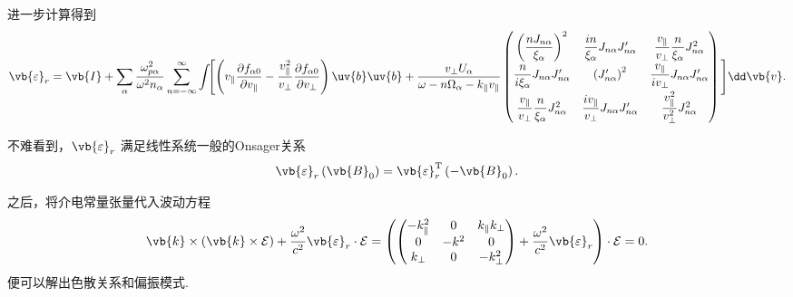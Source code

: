 进一步计算得到
\begin{align*}
	\vb{\varepsilon}_r = \vb{I} + \sum_\alpha \frac{\omega_{p\alpha}^2}{\omega^2 n_\alpha}\sum_{n=-\infty}^{\infty}\int\!\!\Bigg[ \!\left(v_\parallel\frac{\partial f_{\alpha0}}{\partial v_\parallel}-\frac{v_\parallel^2}{v_\perp}\frac{\partial f_{\alpha0}}{\partial v_\perp} \right)\uv{b}\uv{b} + \frac{v_\perp U_\alpha}{\omega-n\Omega_\alpha-k_\parallel v_\parallel}
		\begin{pmatrix}
			\left( \dfrac{nJ_{n\alpha}}{\xi_\alpha} \right)^2              & \dfrac{in}{\xi_\alpha}J_{n\alpha}J_{n\alpha}'        & \dfrac{v_\parallel}{v_\perp}\dfrac{n}{\xi_\alpha}J_{n\alpha}^2 \\[8pt]
			\dfrac{n}{i\xi_\alpha}J_{n\alpha}J_{n\alpha}'                  & \left( J_{n\alpha}' \right)^2                        & \dfrac{v_\parallel}{iv_\perp}J_{n\alpha}J_{n\alpha}'           \\[8pt]
			\dfrac{v_\parallel}{v_\perp}\dfrac{n}{\xi_\alpha}J_{n\alpha}^2 & \dfrac{iv_\parallel}{v_\perp}J_{n\alpha}J_{n\alpha}' & \dfrac{v_\parallel^2}{v_\perp^2}J_{n\alpha}^2
		\end{pmatrix}\Bigg]\dd \vb{v}.
\end{align*}

不难看到，\(\vb{\varepsilon}_r\) 满足线性系统一般的Onsager关系
\begin{align*}
	\vb{\varepsilon}_r\left( \vb{B}_0 \right) = \vb{\varepsilon}_r^\mathrm{T}\left( -\vb{B}_0 \right).
\end{align*}

之后，将介电常量张量代入波动方程
\begin{align*}
	\vb{k}\times\left( \vb{k}\times\mathcal{E} \right) + \frac{\omega^2}{c^2}\vb{\varepsilon}_r\cdot\mathcal{E} = \left( \begin{pmatrix} -k_\parallel^2 & 0 & k_\parallel k_\perp \\ 0 & -k^2 & 0 \\ k_\perp & 0 & -k_\perp^2 \end{pmatrix} + \frac{\omega^2}{c^2}\vb{\varepsilon}_r \right)\cdot\mathcal{E} = 0.
\end{align*}
便可以解出色散关系和偏振模式.

